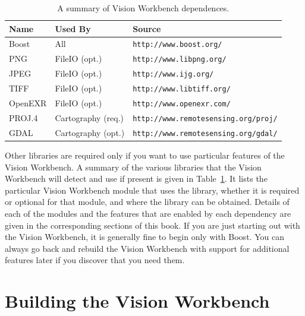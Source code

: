 \begin{table}[t]\begin{centering}
\begin{tabular}{|l|l|l|} \hline
Name    & Used By            & Source                                   \\ \hline \hline
Boost   & All                & \verb#http://www.boost.org/#              \\ \hline
PNG     & FileIO (opt.)      & \verb#http://www.libpng.org/#             \\ \hline
JPEG    & FileIO (opt.)      & \verb#http://www.ijg.org/#                \\ \hline
TIFF    & FileIO (opt.)      & \verb#http://www.libtiff.org/#            \\ \hline
OpenEXR & FileIO (opt.)      & \verb#http://www.openexr.com/#            \\ \hline
PROJ.4  & Cartography (req.) & \verb#http://www.remotesensing.org/proj/# \\ \hline
GDAL    & Cartography (opt.) & \verb#http://www.remotesensing.org/gdal/# \\ \hline
\end{tabular}
\caption{A summary of Vision Workbench dependences.}
\label{tbl:dependencies}
\end{centering}\end{table}

Other libraries are required only if you want to use particular
features of the Vision Workbench.  A summary of the various libraries
that the Vision Workbench will detect and use if present is given in
Table~\ref{tbl:dependencies}.  It lists the particular Vision
Workbench module that uses the library, whether it is required or
optional for that module, and where the library can be obtained.
Details of each of the modules and the features that are enabled by
each dependency are given in the corresponding sections of this book.
If you are just starting out with the Vision Workbench, it is
generally fine to begin only with Boost.  You can always go back and 
rebuild the Vision Workbench with support for additional features 
later if you discover that you need them.

\section{Building the Vision Workbench}


